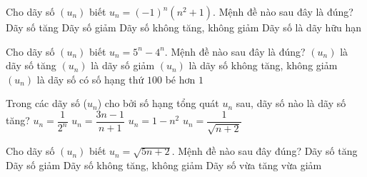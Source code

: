 \begin{ex}%
	Cho dãy số $(u_n)$ biết $u_n=(-1)^n\left(n^2+1\right)$. Mệnh đề nào sau đây là  đúng?
	 \choice
		 {Dãy số tăng}
		{Dãy số giảm} 
		{\True Dãy số không  tăng, không giảm}
		{Dãy số là  dãy hữu hạn}
\end{ex}

\begin{ex}%
	 Cho dãy số $(u_n)$ biết $u_n=5^n-4^n$. Mệnh đề nào sau đây là đúng?
	 \choice
		{\True $(u_n)$ là  dãy số tăng}
		 {$(u_n)$ là dãy số giảm}
		{$(u_n)$ là dãy số không tăng, không giảm} 
		{$(u_n)$ là dãy số có  số hạng thứ $100$ bé hơn $1$}
\end{ex}

\begin{ex}%
	Trong các dãy số ($u_n$) cho bởi số  hạng tổng quát $u_n$ sau, dãy số nào là dãy số tăng?
	\choice 
		{$u_n=\dfrac{1}{2^n}$} 
		{\True $u_n=\dfrac{3n-1}{n+1}$} 
		 {$u_n=1-n^2$}
		 {$u_n=\dfrac{1}{\sqrt{n+2}}$}
\end{ex}

\begin{ex}%
	Cho  dãy số $(u_n)$ biết $u_n=\sqrt{5n+2}$. Mệnh đề nào sau đây đúng?
	\choice 
		{\True Dãy  số tăng}
		 {Dãy số giảm}
		{Dãy số không tăng, không giảm} 
		 {Dãy số vừa tăng vừa giảm}
\end{ex}

